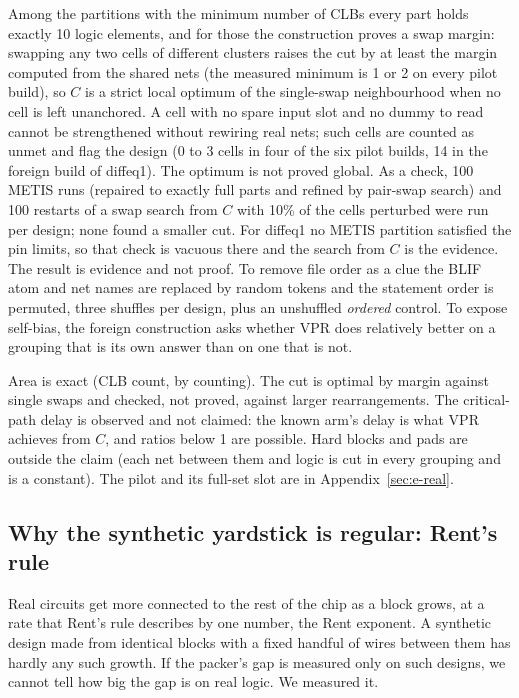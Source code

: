  Among the partitions with the minimum number of CLBs every part holds exactly 10 logic elements, and for those the construction proves a swap margin: swapping any two cells of different clusters raises the cut by at least the margin computed from the shared nets (the measured minimum is 1 or 2 on every pilot build), so $C$ is a strict local optimum of the single-swap neighbourhood when no cell is left unanchored. A cell with no spare input slot and no dummy to read cannot be strengthened without rewiring real nets; such cells are counted as unmet and flag the design (0 to 3 cells in four of the six pilot builds, 14 in the foreign build of diffeq1). The optimum is not proved global. As a check, 100 METIS runs (repaired to exactly full parts and refined by pair-swap search) and 100 restarts of a swap search from $C$ with 10\% of the cells perturbed were run per design; none found a smaller cut. For diffeq1 no METIS partition satisfied the pin limits, so that check is vacuous there and the search from $C$ is the evidence. The result is evidence and not proof. To remove file order as a clue the BLIF atom and net names are replaced by random tokens and the statement order is permuted, three shuffles per design, plus an unshuffled \emph{ordered} control. To expose self-bias, the foreign construction asks whether VPR does relatively better on a grouping that is its own answer than on one that is not.

 Area is exact (CLB count, by counting). The cut is optimal by margin against single swaps and checked, not proved, against larger rearrangements. The critical-path delay is observed and not claimed: the known arm's delay is what VPR achieves from $C$, and ratios below 1 are possible. Hard blocks and pads are outside the claim (each net between them and logic is cut in every grouping and is a constant). The pilot and its full-set slot are in Appendix~\ref{sec:e-real}.

\subsection{Why the synthetic yardstick is regular: Rent's rule}
\label{sec:i-rent}

 Real circuits get more connected to the rest of the chip as a block grows, at a rate that Rent's rule describes by one number, the Rent exponent. A synthetic design made from identical blocks with a fixed handful of wires between them has hardly any such growth. If the packer's gap is measured only on such designs, we cannot tell how big the gap is on real logic. We measured it.

